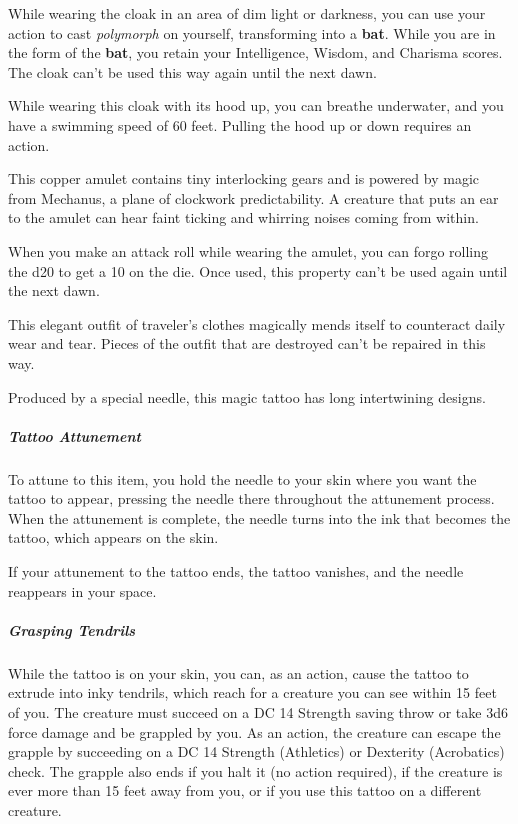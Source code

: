 \documentclass[10pt,a4paper,twoside,bg=print,twocolumn,openany,nodeprecatedcode]{dndbook}
\begin{document}
While wearing the cloak in an area of dim light or darkness, you can use your action to cast \textit{polymorph} on yourself, transforming into a \textbf{bat}. While you are in the form of the \textbf{bat}, you retain your Intelligence, Wisdom, and Charisma scores. The cloak can't be used this way again until the next dawn.

While wearing this cloak with its hood up, you can breathe underwater, and you have a swimming speed of 60 feet. Pulling the hood up or down requires an action.

This copper amulet contains tiny interlocking gears and is powered by magic from Mechanus, a plane of clockwork predictability. A creature that puts an ear to the amulet can hear faint ticking and whirring noises coming from within.

When you make an attack roll while wearing the amulet, you can forgo rolling the d20 to get a 10 on the die. Once used, this property can't be used again until the next dawn.

This elegant outfit of traveler's clothes magically mends itself to counteract daily wear and tear. Pieces of the outfit that are destroyed can't be repaired in this way.

Produced by a special needle, this magic tattoo has long intertwining designs.

\subparagraph{Tattoo Attunement}
To attune to this item, you hold the needle to your skin where you want the tattoo to appear, pressing the needle there throughout the attunement process. When the attunement is complete, the needle turns into the ink that becomes the tattoo, which appears on the skin.

If your attunement to the tattoo ends, the tattoo vanishes, and the needle reappears in your space.

\subparagraph{Grasping Tendrils}
While the tattoo is on your skin, you can, as an action, cause the tattoo to extrude into inky tendrils, which reach for a creature you can see within 15 feet of you. The creature must succeed on a DC 14 Strength saving throw or take 3d6 force damage and be grappled by you. As an action, the creature can escape the grapple by succeeding on a DC 14 Strength (Athletics) or Dexterity (Acrobatics) check. The grapple also ends if you halt it (no action required), if the creature is ever more than 15 feet away from you, or if you use this tattoo on a different creature.
\end{document}
